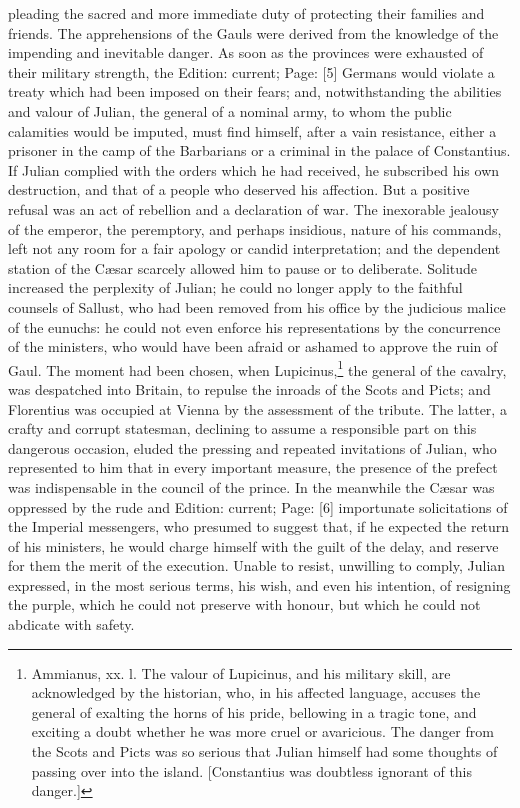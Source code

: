 pleading the sacred and more immediate duty of protecting their families and friends. The apprehensions of the Gauls were derived from the knowledge of the impending and inevitable danger. As soon as the provinces were exhausted of their military strength, the Edition: current; Page: [5] Germans would violate a treaty which had been imposed on their fears; and, notwithstanding the abilities and valour of Julian, the general of a nominal army, to whom the public calamities would be imputed, must find himself, after a vain resistance, either a prisoner in the camp of the Barbarians or a criminal in the palace of Constantius. If Julian complied with the orders which he had received, he subscribed his own destruction, and that of a people who deserved his affection. But a positive refusal was an act of rebellion and a declaration of war. The inexorable jealousy of the emperor, the peremptory, and perhaps insidious, nature of his commands, left not any room for a fair apology or candid interpretation; and the dependent station of the Cæsar scarcely allowed him to pause or to deliberate. Solitude increased the perplexity of Julian; he could no longer apply to the faithful counsels of Sallust, who had been removed from his office by the judicious malice of the eunuchs: he could not even enforce his representations by the concurrence of the ministers, who would have been afraid or ashamed to approve the ruin of Gaul. The moment had been chosen, when Lupicinus,\footnote{Ammianus, xx. l. The valour of Lupicinus, and his military skill, are acknowledged by the historian, who, in his affected language, accuses the general of exalting the horns of his pride, bellowing in a tragic tone, and exciting a doubt whether he was more cruel or avaricious. The danger from the Scots and Picts was so serious that Julian himself had some thoughts of passing over into the island. [Constantius was doubtless ignorant of this danger.]} the general of the cavalry, was despatched into Britain, to repulse the inroads of the Scots and Picts; and Florentius was occupied at Vienna by the assessment of the tribute. The latter, a crafty and corrupt statesman, declining to assume a responsible part on this dangerous occasion, eluded the pressing and repeated invitations of Julian, who represented to him that in every important measure, the presence of the prefect was indispensable in the council of the prince. In the meanwhile the Cæsar was oppressed by the rude and Edition: current; Page: [6] importunate solicitations of the Imperial messengers, who presumed to suggest that, if he expected the return of his ministers, he would charge himself with the guilt of the delay, and reserve for them the merit of the execution. Unable to resist, unwilling to comply, Julian expressed, in the most serious terms, his wish, and even his intention, of resigning the purple, which he could not preserve with honour, but which he could not abdicate with safety.

